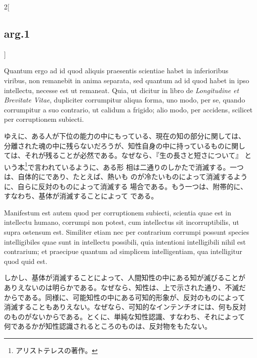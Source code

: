 \documentclass[paper=a4paper,fontsize=10pt,jafontsize=9pt,titlepage]{jlreq}
\begin{document}
\begin{paracol}{2}[\subsection{arg.1}]
\switchcolumn*

Quantum ergo ad id quod aliquis praesentis scientiae habet in
inferioribus viribus, non remanebit in anima separata, sed quantum ad
id quod habet in ipso intellectu, necesse est ut remaneat. Quia, ut
dicitur in libro de {\itshape Longitudine et Brevitate Vitae}, dupliciter
corrumpitur aliqua forma, uno modo, per se, quando corrumpitur a suo
contrario, ut calidum a frigido; alio modo, per accidens, scilicet per
corruptionem subiecti.

\switchcolumn

ゆえに、ある人が下位の能力の中にもっている、現在の知の部分に関しては、
分離された魂の中に残らないだろうが、知性自身の中に持っているものに関し
ては、それが残ることが必然である。なぜなら、『生の長さと短さについて』
という本\footnote{アリストテレスの著作。}で言われているように、ある形
相は二通りのしかたで消滅する。一つは、自体的にであり、たとえば、熱いも
のが冷たいものによって消滅するように、自らに反対のものによって消滅する
場合である。もう一つは、附帯的に、すなわち、基体が消滅することによって
である。

\switchcolumn*

Manifestum est autem quod per corruptionem subiecti, scientia quae est
in intellectu humano, corrumpi non potest, cum intellectus sit
incorruptibilis, ut supra ostensum est. Similiter etiam nec per
contrarium corrumpi possunt species intelligibiles quae sunt in
intellectu possibili, quia intentioni intelligibili nihil est
contrarium; et praecipue quantum ad simplicem intelligentiam, qua
intelligitur quod quid est.

\switchcolumn

しかし、基体が消滅することによって、人間知性の中にある知が滅びることが
ありえないのは明らかである。なぜなら、知性は、上で示された通り、不滅だ
からである。同様に、可能知性の中にある可知的形象が、反対のものによって
消滅することもありえない。なぜなら、可知的なインテンチオには、何も反対
のものがないからである。とくに、単純な知性認識、すなわち、それによって
何であるかが知性認識されるところのものは、反対物をもたない。


\end{paracol}
\end{document}
